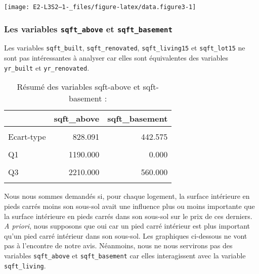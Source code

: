 \documentclass[
  11pt,
  french,
]{article}
\begin{document}
\begin{center}\texttt{[image: E2-L3S2--1-\_files/figure-latex/data.figure3-1]} \end{center}

\newpage

\hypertarget{les-variables-sqft_above-et-sqft_basement}{%
\subsubsection{\texorpdfstring{Les variables \texttt{sqft\_above} et
\texttt{sqft\_basement}}{Les variables sqft\_above et sqft\_basement}}\label{les-variables-sqft_above-et-sqft_basement}}

Les variables \texttt{sqft\_built}, \texttt{sqft\_renovated},
\texttt{sqft\_living15} et \texttt{sqft\_lot15} ne sont pas
intéressantes à analyser car elles sont équivalentes des variables
\texttt{yr\_built} et \texttt{yr\_renovated}.

\begin{table}[!h]

\caption{\label{tab:unnamed-chunk-4}Résumé des variables sqft-above et sqft-basement :}
\centering
\begin{tabular}[t]{lrr}
\toprule
  & sqft\_above & sqft\_basement\\
\midrule
\cellcolor{gray!6}{Moyenne} & \cellcolor{gray!6}{1788.391} & \cellcolor{gray!6}{291.509}\\
Ecart-type & 828.091 & 442.575\\
\cellcolor{gray!6}{Minimum} & \cellcolor{gray!6}{290.000} & \cellcolor{gray!6}{0.000}\\
Q1 & 1190.000 & 0.000\\
\cellcolor{gray!6}{Q2} & \cellcolor{gray!6}{1560.000} & \cellcolor{gray!6}{0.000}\\
\addlinespace
Q3 & 2210.000 & 560.000\\
\cellcolor{gray!6}{Maximum} & \cellcolor{gray!6}{9410.000} & \cellcolor{gray!6}{4820.000}\\
\bottomrule
\end{tabular}
\end{table}

Nous nous sommes demandés si, pour chaque logement, la surface
intérieure en pieds carrés moins son sous-sol avait une influence plus
ou moins importante que la surface intérieure en pieds carrés dans son
sous-sol sur le prix de ces derniers. \textit{A priori}, nous supposons
que oui car un pied carré intérieur est plus important qu'un pied carré
intérieur dans son sous-sol. Les graphiques ci-dessous ne vont pas à
l'encontre de notre avis. Néanmoins, nous ne nous servirons pas des
variables \texttt{sqft\_above} et \texttt{sqft\_basement} car elles
interagissent avec la variable \texttt{sqft\_living}.
\end{document}
